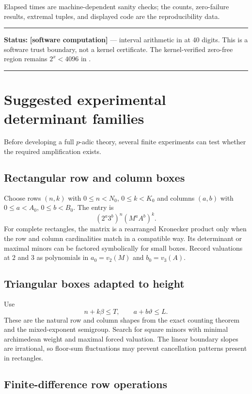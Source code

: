 \documentclass[11pt,oneside]{article}
\theoremstyle{definition}
\theoremstyle{remark}
\newcommand{\thetaq}{\vartheta}
\newcommand{\vpp}[2]{v_{#1}\!\left(#2\right)}
\newcommand{\lean}[1]{\texttt{\detokenize{#1}}}
\newcommand{\statuscomp}{\textcolor{computeviolet}{\textbf{[software computation]}}}
\newenvironment{statusbox}[1]
{\begin{center}\begin{minipage}{0.94\textwidth}\raggedright\hbadness=10000\hrule
\vspace{0.45em}\textbf{Status:} #1\par\vspace{0.35em}}
{\vspace{0.35em}\hrule\end{minipage}\end{center}}
\begin{document}
Elapsed times are machine-dependent sanity checks; the counts, zero-failure results, extremal
tuples, and displayed code are the reproducibility data.

\begin{statusbox}{\statuscomp{} --- interval arithmetic in \lean{mpmath} \cite{mpmath} at 40
digits.  This is a software trust boundary, not a kernel certificate.  The kernel-verified
zero-free region remains $2^x<4096$ in \lean{FiniteCheck4096}.}
\end{statusbox}

\section{Suggested experimental determinant families}
\label{app:experiments}

Before developing a full $p$-adic theory, several finite experiments can test whether the
required amplification exists.

\subsection{Rectangular row and column boxes}

Choose rows $(n,k)$ with $0\le n<N_0$, $0\le k<K_0$ and columns $(a,b)$ with
$0\le a<A_0$, $0\le b<B_0$.  The entry is
\[
 (2^a3^b)^n(M^aA^b)^k.
\]
For complete rectangles, the matrix is a rearranged Kronecker product only when the row and
column cardinalities match in a compatible way.  Its determinant or maximal minors can be
factored symbolically for small boxes.  Record valuations at $2$ and $3$ as polynomials in
$a_0=\vpp{2}{M}$ and $b_0=\vpp{3}{A}$.

\subsection{Triangular boxes adapted to height}

Use
\[
 n+k\beta\le T,
 \qquad
 a+b\thetaq\le L.
\]
These are the natural row and column shapes from the exact counting theorem and the
mixed-exponent semigroup.  Search for square minors with minimal archimedean weight and
maximal forced valuation.  The linear boundary slopes are irrational, so floor-sum
fluctuations may prevent cancellation patterns present in rectangles.

\subsection{Finite-difference row operations}
\end{document}
